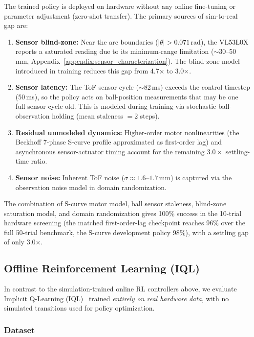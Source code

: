 The trained policy is deployed on hardware without any online
fine-tuning or parameter adjustment (zero-shot transfer).
The primary sources of sim-to-real gap are:
\begin{enumerate}
  \item \textbf{Sensor blind-zone:} Near the arc boundaries
        ($|\theta| > 0.071$\,rad), the VL53L0X reports a saturated
        reading due to its minimum-range limitation
        ($\sim$30--50\,mm, Appendix~\ref{appendix:sensor_characterization}).
        The blind-zone model introduced in training reduces this gap
        from 4.7$\times$ to 3.0$\times$.
  \item \textbf{Sensor latency:} The ToF sensor cycle ($\sim$82\,ms)
        exceeds the control timestep (50\,ms), so the policy acts
        on ball-position measurements that may be one full
        sensor cycle old.
        This is modeled during training via stochastic ball-observation
        holding (mean staleness $= 2$ steps).
  \item \textbf{Residual unmodeled dynamics:} Higher-order motor
        nonlinearities (the Beckhoff 7-phase S-curve profile
        approximated as first-order lag) and asynchronous
        sensor-actuator timing account for the remaining
        $3.0\times$ settling-time ratio.
  \item \textbf{Sensor noise:} Inherent ToF noise
        ($\sigma \approx 1.6$--$1.7$\,mm) is captured
        via the observation noise model in domain randomization.
\end{enumerate}
The combination of S-curve motor model, ball sensor staleness,
blind-zone saturation model, and domain randomization gives
100\% success in the 10-trial hardware screening (the matched
first-order-lag checkpoint reaches 96\% over the full 50-trial
benchmark, the S-curve development policy 98\%), with a settling
gap of only 3.0$\times$.

\subsection{Offline Reinforcement Learning (IQL)}
\label{appendix:offline_rl}

In contrast to the simulation-trained online RL controllers above,
we evaluate Implicit Q-Learning (IQL)~\cite{kostrikov2022iql}
trained \emph{entirely on real hardware data}, with no simulated
transitions used for policy optimization.

\subsubsection{Dataset}

